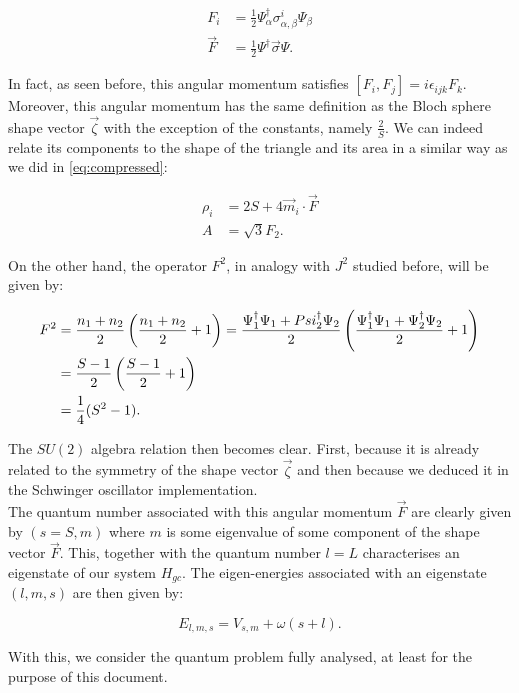 \begin{align*}
F_i  &= \frac{1}{2}\Psi_\alpha^\dagger \sigma^i_{\alpha,\beta}\Psi_\beta\\
\vec{F} &= \frac{1}{2}\Psi^\dagger \vec{\sigma}\Psi.
\end{align*}

In fact, as seen before, this angular momentum satisfies $[F_i,F_j] = i\epsilon_{ijk}F_k$. Moreover, this angular momentum has the same definition as the Bloch sphere shape vector $\vec{\zeta}$ with the exception of the constants, namely $\frac{2}{S}$. We can indeed relate its components to the shape of the triangle and its area in a similar way as we did in \eqref{eq:compressed}:

\begin{align*}
\rho_i &= 2S+4\vec{m}_i\cdot\vec{F}\\
A &= \sqrt{3}F_2.
\end{align*}

On the other hand, the operator $F^2$, in analogy with $J^2$ studied before, will be given by: 

\begin{align*}
F^2 &= \frac{n_1+n_2}{2}\left( \frac{n_1+n_2}{2}+1 \right) = \frac{\Psi_1^\dagger \Psi_1 + Psi_2^\dagger \Psi_2}{2}\left( \frac{\Psi_1^\dagger \Psi_1 + \Psi_2^\dagger \Psi_2}{2}+1 \right)\\
&= \frac{S-1}{2}\left( \frac{S-1}{2}+1 \right)\\
&= \frac{1}{4}(S^2-1).
\end{align*}

The $SU(2)$ algebra relation then becomes clear. First, because it is already related to the symmetry of the shape vector $\vec{\zeta}$ and then because we deduced it in the Schwinger oscillator implementation.\\

The quantum number associated with this angular momentum $\vec{F}$ are clearly given by $(s= S,m)$ where $m$ is some eigenvalue of some component of the shape vector $\vec{F}$. This, together with the quantum number $l=L$ characterises an eigenstate of our system $H_{gc}$. The eigen-energies associated with an eigenstate $(l,m,s)$ are then given by:

\begin{equation*}
E_{l,m,s} = V_{s,m} + \omega(s+l).
\end{equation*}

With this, we consider the quantum problem fully analysed, at least for the purpose of this document.
















